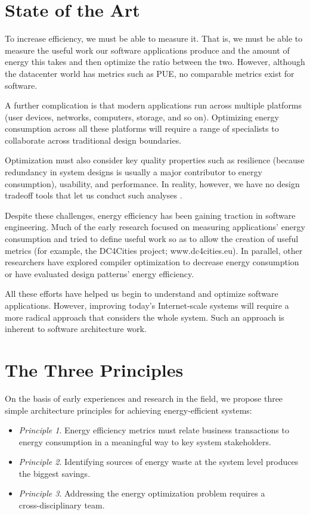 \section{State of the Art}

To increase efficiency, we must be able to measure it. That is, we must be able to measure the useful work our software applications produce and the amount of energy this takes and then optimize the ratio between the two. However, although the datacenter world has metrics such as PUE, no comparable metrics exist for software.

A further complication is that modern applications run across multiple platforms (user devices, networks, computers, storage, and so on). Optimizing energy consumption across all these platforms will require a range of specialists to collaborate across traditional design boundaries.

Optimization must also consider key quality properties such as resilience (because redundancy in system designs is usually a major contributor to energy consumption), usability, and performance. In reality, however, we have no design tradeoff tools that let us conduct such analyses \cite{bashroush2016-datacentreenergy}.

Despite these challenges, energy efficiency has been gaining traction in software engineering. Much of the early research focused on measuring applications' energy consumption \cite{islam2016-energysoftwarefeatures} and tried to define useful work so as to allow the creation of useful metrics (for example, the DC4Cities project; www.dc4cities.eu). In parallel, other researchers have explored compiler optimization to decrease energy consumption or have evaluated design patterns' energy efficiency.

All these efforts have helped us begin to understand and optimize software applications. However, improving today's Internet-scale systems will require a more radical approach that considers the whole system. Such an approach is inherent to software architecture work.

\section{The Three Principles}

On the basis of early experiences and research in the field, we propose three simple architecture principles for achieving energy-efficient systems:

\begin{itemize}
\item \emph{Principle 1}. Energy efficiency metrics must relate business transactions to energy consumption in a meaningful way to key system stakeholders.
\item \emph{Principle 2}. Identifying sources of energy waste at the system level produces the biggest savings.
\item \emph{Principle 3}. Addressing the energy optimization problem requires a \\ cross-disciplinary team.
\end{itemize}


